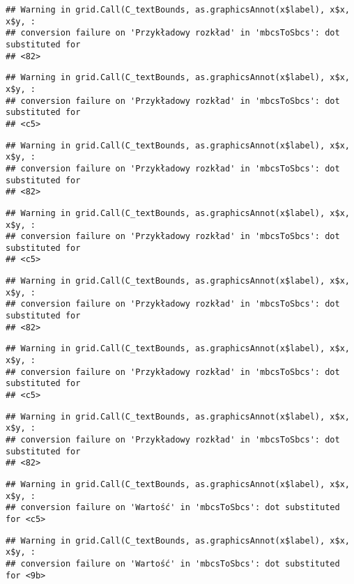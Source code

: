 \documentclass[
]{book}
\begin{document}
\begin{verbatim}
## Warning in grid.Call(C_textBounds, as.graphicsAnnot(x$label), x$x, x$y, :
## conversion failure on 'Przykładowy rozkład' in 'mbcsToSbcs': dot substituted for
## <82>
\end{verbatim}

\begin{verbatim}
## Warning in grid.Call(C_textBounds, as.graphicsAnnot(x$label), x$x, x$y, :
## conversion failure on 'Przykładowy rozkład' in 'mbcsToSbcs': dot substituted for
## <c5>
\end{verbatim}

\begin{verbatim}
## Warning in grid.Call(C_textBounds, as.graphicsAnnot(x$label), x$x, x$y, :
## conversion failure on 'Przykładowy rozkład' in 'mbcsToSbcs': dot substituted for
## <82>
\end{verbatim}

\begin{verbatim}
## Warning in grid.Call(C_textBounds, as.graphicsAnnot(x$label), x$x, x$y, :
## conversion failure on 'Przykładowy rozkład' in 'mbcsToSbcs': dot substituted for
## <c5>
\end{verbatim}

\begin{verbatim}
## Warning in grid.Call(C_textBounds, as.graphicsAnnot(x$label), x$x, x$y, :
## conversion failure on 'Przykładowy rozkład' in 'mbcsToSbcs': dot substituted for
## <82>
\end{verbatim}

\begin{verbatim}
## Warning in grid.Call(C_textBounds, as.graphicsAnnot(x$label), x$x, x$y, :
## conversion failure on 'Przykładowy rozkład' in 'mbcsToSbcs': dot substituted for
## <c5>
\end{verbatim}

\begin{verbatim}
## Warning in grid.Call(C_textBounds, as.graphicsAnnot(x$label), x$x, x$y, :
## conversion failure on 'Przykładowy rozkład' in 'mbcsToSbcs': dot substituted for
## <82>
\end{verbatim}

\begin{verbatim}
## Warning in grid.Call(C_textBounds, as.graphicsAnnot(x$label), x$x, x$y, :
## conversion failure on 'Wartość' in 'mbcsToSbcs': dot substituted for <c5>
\end{verbatim}

\begin{verbatim}
## Warning in grid.Call(C_textBounds, as.graphicsAnnot(x$label), x$x, x$y, :
## conversion failure on 'Wartość' in 'mbcsToSbcs': dot substituted for <9b>
\end{verbatim}
\end{document}
